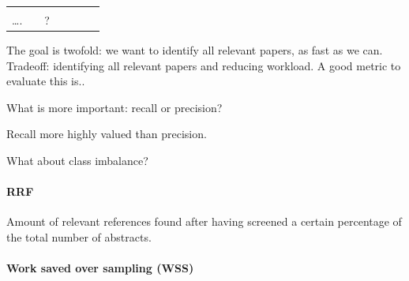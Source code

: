 \documentclass[
]{article}
\begin{document}
\begin{longtable}[]{@{}lllllll@{}}
\begin{minipage}[t]{0.10\columnwidth}
\strut
\end{minipage} & \begin{minipage}[t]{0.10\columnwidth}\raggedright
\strut
\end{minipage} & \begin{minipage}[t]{0.10\columnwidth}\raggedright
\strut
\end{minipage}\tabularnewline
\begin{minipage}[t]{0.29\columnwidth}\raggedright
\ldots.\strut
\end{minipage} & \begin{minipage}[t]{0.03\columnwidth}\raggedright
\strut
\end{minipage} & \begin{minipage}[t]{0.10\columnwidth}\raggedright
?\strut
\end{minipage} & \begin{minipage}[t]{0.10\columnwidth}\raggedright
\strut
\end{minipage} & \begin{minipage}[t]{0.10\columnwidth}\raggedright
\strut
\end{minipage} & \begin{minipage}[t]{0.10\columnwidth}\raggedright
\strut
\end{minipage} & \begin{minipage}[t]{0.10\columnwidth}\raggedright
\strut
\end{minipage}\tabularnewline
\bottomrule
\end{longtable}

The goal is twofold: we want to identify all relevant papers, as fast as
we can. Tradeoff: identifying all relevant papers and reducing workload.
A good metric to evaluate this is..

What is more important: recall or precision?

Recall more highly valued than precision.

What about class imbalance?

\hypertarget{rrf}{%
\paragraph{RRF}\label{rrf}}

Amount of relevant references found after having screened a certain
percentage of the total number of abstracts.

\hypertarget{work-saved-over-sampling-wss}{%
\paragraph{Work saved over sampling
(WSS)}\label{work-saved-over-sampling-wss}}
\end{document}
